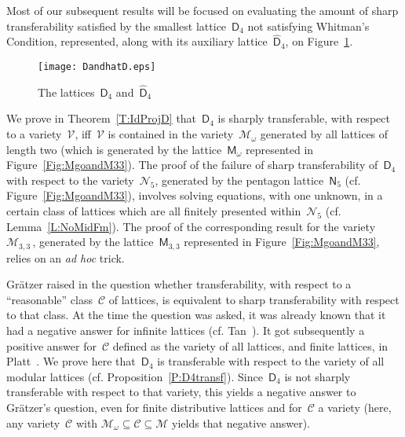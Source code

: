\documentclass[reqno]{amsart}
\numberwithin{equation}{section}
\theoremstyle{plain}
\theoremstyle{definition}
\theoremstyle{remark}
\numberwithin{figure}{section}
\numberwithin{table}{section}
\begin{document}
Most of our subsequent results will be focused on evaluating the amount of sharp transferability satisfied by the smallest lattice~${\mathsf{D}_{4}}$ not satisfying Whitman's Condition, represented, along with its auxiliary lattice~${\widehat{\mathsf{D}}_{4}}$, on Figure~\ref{Fig:DandhatD}.

\begin{figure}[htb]
\texttt{[image: DandhatD.eps]}
\caption{The lattices~${\mathsf{D}_{4}}$ and~${\widehat{\mathsf{D}}_{4}}$}
\label{Fig:DandhatD}
\end{figure}

We prove in Theorem~\ref{T:IdProjD} that~${\mathsf{D}_{4}}$ is sharply transferable, with respect to a variety~${\mathcal{V}}$, if{f}~${\mathcal{V}}$ is contained in the variety~${\mathcal{M}}_{\omega}$ generated by all lattices of length two (which is generated by the lattice~${{\mathsf{M}}}_{\omega}$ represented in Figure~\ref{Fig:MgoandM33}).
The proof of the failure of sharp transferability of~${\mathsf{D}_{4}}$ with respect to the variety~${\mathcal{N}}_5$, generated by the pentagon lattice~${{\mathsf{N}}}_5$ (cf. Figure~\ref{Fig:MgoandM33}), involves solving equations, with one unknown, in a certain class of lattices which are all finitely presented within~${\mathcal{N}}_5$ (cf. Lemma~\ref{L:NoMidFm}).
The proof of the corresponding result for the variety~${\mathcal{M}}_{3,3}$\,, generated by the lattice~${{\mathsf{M}}}_{3,3}$ represented in Figure~\ref{Fig:MgoandM33}, relies on an \emph{ad hoc} trick.

Gr\"atzer raised in \cite[Problems~I.26 and~I.27]{GLT1} the question whether transferability, with respect to a ``reasonable'' class~${\mathcal{C}}$ of lattices, is equivalent to sharp transferability with respect to that class.
At the time the question was asked, it was already known that it had a negative answer for infinite lattices (cf. Tan~\cite{Tan75}).
It got subsequently a positive answer for~${\mathcal{C}}$ defined as the variety of all lattices, and finite lattices, in Platt~\cite{Platt81}.
We prove here that~${\mathsf{D}_{4}}$ is transferable with respect to the variety of all modular lattices (cf. Proposition~\ref{P:D4transf}).
Since~${\mathsf{D}_{4}}$ is not sharply transferable with respect to that variety, this yields a negative answer to Gr\"atzer's question, even for finite distributive lattices and for~${\mathcal{C}}$ a variety (here, any variety~${\mathcal{C}}$ with ${\mathcal{M}}_{\omega}\subseteq{\mathcal{C}}\subseteq{\mathcal{M}}$ yields that negative answer).
\end{document}
